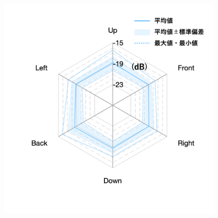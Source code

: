 \documentclass[11pt,a4j]{jreport}
\begin{document}
\begin{figure}[H]
\begin{minipage}[b]{.33\textwidth}
    \label{fig:S02late}
  \end{minipage}%
  \begin{minipage}[b]{.33\textwidth}
    \centering
    \includegraphics[width=1\linewidth]{images/realHallDirSt/late_S01_withLegend.png}
    \label{fig:S01late}
  \end{minipage}


\end{figure}
\end{document}
